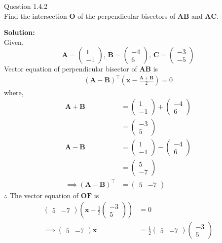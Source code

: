 \documentclass[journal,12pt,twocolumn]{IEEEtran}
\theoremstyle{remark}
\newcommand{\myvec}[1]{\ensuremath{\begin{pmatrix}#1\end{pmatrix}}}
\providecommand{\brak}[1]{\ensuremath{\left(#1\right)}}
\let\vec\mathbf
\newcommand{\solution}{\noindent \textbf{Solution: }}
\begin{document}
%

Question 1.4.2\\
Find the intersection $\vec{O}$ of the perpendicular bisectors of $\vec{AB}$ and $\vec{AC}$.

\solution \\
Given,
$$\vec{A}=\myvec{1\\-1} ,\, \vec{B}=\myvec{-4\\6} ,\, \vec{C}=\myvec{-3\\-5}$$
Vector equation of perpendicular bisector of $\vec{AB}$ is
\begin{align}
 (\vec{A}-\vec{B})^\top  \brak{ \vec{x} - \frac{\vec{A}+\vec{B}}{2}} = 0
\end{align}
where,
\begin{align}
\vec{A}+\vec{B}&=\myvec{1\\-1}+\myvec{-4\\6}\\
&=\myvec{-3\\5}\\
\vec{A}-\vec{B} &= \myvec{1\\-1}-\myvec{-4\\6}\\
&=\myvec{5\\-7}\\
\implies (\vec{A}-\vec{B})^\top &= \myvec{5&-7}
\end{align}
$\therefore $ The vector equation of $\vec{OF}$ is
\begin{align}
\myvec{5&-7} \brak{ \vec{x}-\frac{1}{2}\myvec{-3\\5} }&=0\\
\implies \myvec{5&-7}\vec{x}&=\frac{1}{2}\myvec{5&-7}\myvec{-3\\5}
\end{align}
\end{document}
